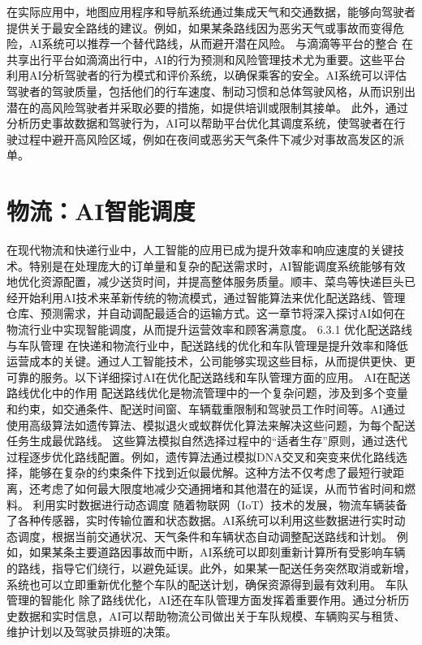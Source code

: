 在实际应用中，地图应用程序和导航系统通过集成天气和交通数据，能够向驾驶者提供关于最安全路线的建议。例如，如果某条路线因为恶劣天气或事故而变得危险，AI系统可以推荐一个替代路线，从而避开潜在风险。
与滴滴等平台的整合
在共享出行平台如滴滴出行中，AI的行为预测和风险管理技术尤为重要。这些平台利用AI分析驾驶者的行为模式和评价系统，以确保乘客的安全。AI系统可以评估驾驶者的驾驶质量，包括他们的行车速度、制动习惯和总体驾驶风格，从而识别出潜在的高风险驾驶者并采取必要的措施，如提供培训或限制其接单。
此外，通过分析历史事故数据和驾驶行为，AI可以帮助平台优化其调度系统，使驾驶者在行驶过程中避开高风险区域，例如在夜间或恶劣天气条件下减少对事故高发区的派单。

\section{物流：AI智能调度} 
在现代物流和快递行业中，人工智能的应用已成为提升效率和响应速度的关键技术。特别是在处理庞大的订单量和复杂的配送需求时，AI智能调度系统能够有效地优化资源配置，减少送货时间，并提高整体服务质量。顺丰、菜鸟等快递巨头已经开始利用AI技术来革新传统的物流模式，通过智能算法来优化配送路线、管理仓库、预测需求，并自动调配最适合的运输方式。这一章节将深入探讨AI如何在物流行业中实现智能调度，从而提升运营效率和顾客满意度。
6.3.1 优化配送路线与车队管理
在快递和物流行业中，配送路线的优化和车队管理是提升效率和降低运营成本的关键。通过人工智能技术，公司能够实现这些目标，从而提供更快、更可靠的服务。以下详细探讨AI在优化配送路线和车队管理方面的应用。
AI在配送路线优化中的作用
配送路线优化是物流管理中的一个复杂问题，涉及到多个变量和约束，如交通条件、配送时间窗、车辆载重限制和驾驶员工作时间等。AI通过使用高级算法如遗传算法、模拟退火或蚁群优化算法来解决这些问题，为每个配送任务生成最优路线。
这些算法模拟自然选择过程中的“适者生存”原则，通过迭代过程逐步优化路线配置。例如，遗传算法通过模拟DNA交叉和突变来优化路线选择，能够在复杂的约束条件下找到近似最优解。这种方法不仅考虑了最短行驶距离，还考虑了如何最大限度地减少交通拥堵和其他潜在的延误，从而节省时间和燃料。
利用实时数据进行动态调度
随着物联网（IoT）技术的发展，物流车辆装备了各种传感器，实时传输位置和状态数据。AI系统可以利用这些数据进行实时动态调度，根据当前交通状况、天气条件和车辆状态自动调整配送路线和计划。
例如，如果某条主要道路因事故而中断，AI系统可以即刻重新计算所有受影响车辆的路线，指导它们绕行，以避免延误。此外，如果某一配送任务突然取消或新增，系统也可以立即重新优化整个车队的配送计划，确保资源得到最有效利用。
车队管理的智能化
除了路线优化，AI还在车队管理方面发挥着重要作用。通过分析历史数据和实时信息，AI可以帮助物流公司做出关于车队规模、车辆购买与租赁、维护计划以及驾驶员排班的决策。
